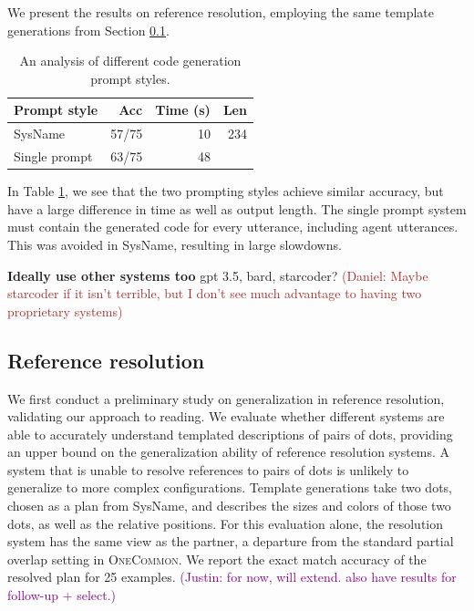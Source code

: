 \documentclass[11pt]{article}
\newcommand{\system}{SysName}
\newcommand{\justin}[1]{{{\textcolor{purple}{(Justin: #1)}}}}
\newcommand{\daniel}[1]{{{\textcolor{brown}{(Daniel: #1)}}}}
\begin{document}
We present the results on reference resolution,
employing the same template generations from Section \ref{sec:refres}.

\begin{table}[!t]
\centering
\begin{tabular}{lrrr}
\toprule
Prompt style                   & Acc     & Time (s) & Len\\
\midrule
\system{}                      & 57/75  & 10    &  234\\
Single prompt                  & 63/75  & 48    &    \\
\bottomrule
\end{tabular}
\caption{\label{tbl:prompt}
An analysis of different code generation prompt styles.
}
\end{table}

In Table \ref{tbl:prompt}, we see that the two prompting styles achieve similar accuracy, but have a large difference in time as well as output length.
The single prompt system must contain the generated code for every utterance, including agent utterances.
This was avoided in \system{}, resulting in large slowdowns.

\textbf{Ideally use other systems too}
gpt 3.5, bard, starcoder?
\daniel{Maybe starcoder if it isn't terrible, but I don't see much advantage to having two proprietary systems}


\subsection{Reference resolution}
\label{sec:refres}
We first conduct a preliminary study on generalization in reference resolution, validating our approach to reading.
We evaluate whether different systems are able to accurately understand templated descriptions of pairs of dots, providing an upper bound on the generalization ability of reference resolution systems.
A system that is unable to resolve references to pairs of dots is unlikely to generalize to more complex configurations.
Template generations take two dots, chosen as a plan from \system{},
and describes the sizes and colors of those two dots, as well as the relative positions.
For this evaluation alone, the resolution system has the same view as the partner,
a departure from the standard partial overlap setting in \textsc{OneCommon}.
We report the exact match accuracy of the resolved plan for 25 examples.
\justin{for now, will extend. also have results for follow-up + select.}
\end{document}
